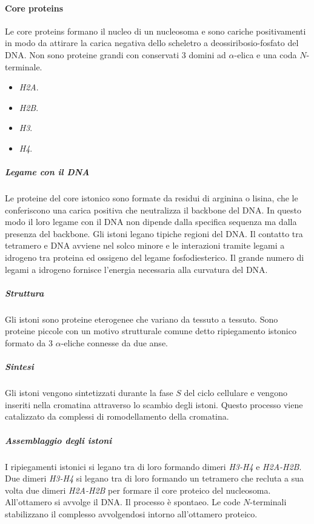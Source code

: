 			\paragraph{Core proteins}
			Le core proteins formano il nucleo di un nucleosoma e sono cariche positivamenti in modo da attirare la carica negativa dello scheletro a deossiribosio-fosfato del DNA.
			Non sono proteine grandi con conservati $3$ domini ad $\alpha$-elica e una coda $N$-terminale.
			\begin{multicols}{4}
				\begin{itemize}
					\item \emph{H2A}.
					\item \emph{H2B}.
					\item \emph{H3}.
					\item \emph{H4}.
				\end{itemize}
			\end{multicols}
			
				\subparagraph{Legame con il DNA}
				Le proteine del core istonico sono formate da residui di arginina o lisina, che le conferiscono una carica positiva che neutralizza il backbone del DNA.
				In questo modo il loro legame con il DNA non dipende dalla specifica sequenza ma dalla presenza del backbone.
				Gli istoni legano tipiche regioni del DNA.
				Il contatto tra tetramero e DNA avviene nel solco minore e le interazioni tramite legami a idrogeno tra proteina ed ossigeno del legame fosfodiesterico.
				Il grande numero di legami a idrogeno fornisce l'energia necessaria alla curvatura del DNA.

				\subparagraph{Struttura}
				Gli istoni sono proteine eterogenee che variano da tessuto a tessuto.
				Sono proteine piccole con un motivo strutturale comune detto ripiegamento istonico formato da $3$ $\alpha$-eliche connesse da due anse.

				\subparagraph{Sintesi}
				Gli istoni vengono sintetizzati durante la fase $S$ del ciclo cellulare e vengono inseriti nella cromatina attraverso lo scambio degli istoni.
				Questo processo viene catalizzato da complessi di romodellamento della cromatina.
				
				\subparagraph{Assemblaggio degli istoni}
				I ripiegamenti istonici si legano tra di loro formando dimeri \emph{H3-H4} e \emph{H2A-H2B}.
				Due dimeri \emph{H3-H4} si legano tra di loro formando un tetramero che recluta a sua volta due dimeri \emph{H2A-H2B} per formare il core proteico del nucleosoma.
				All'ottamero si avvolge il DNA.
				Il processo \`e spontaeo.
				Le code $N$-terminali stabilizzano il complesso avvolgendosi intorno all'ottamero proteico.

